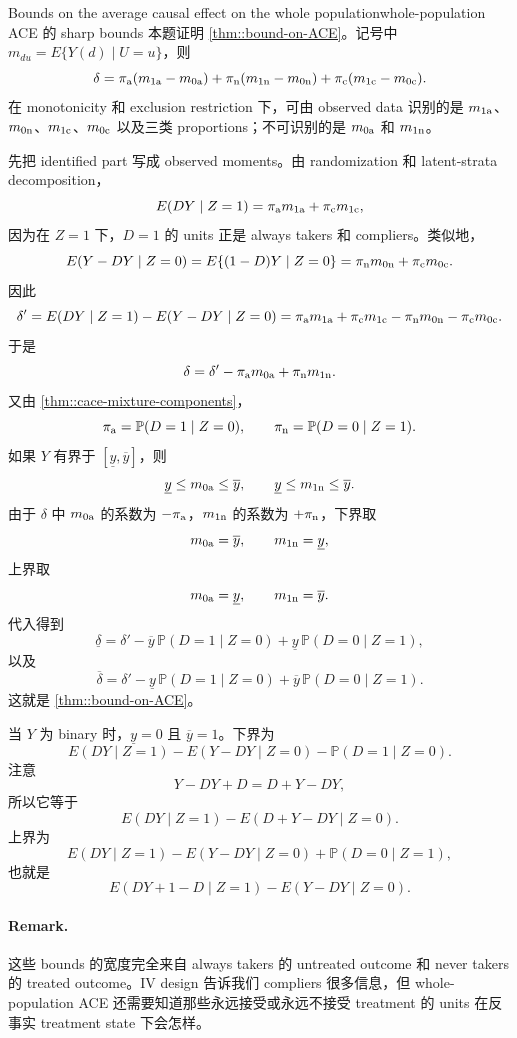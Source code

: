 \begin{exercisesolution}{Bounds on the average causal effect on the whole population}{whole-population ACE 的 sharp bounds}
本题证明 \cref{thm::bound-on-ACE}。记号中 $m_{du}=E\{Y(d)\mid U=u\}$，则
\[
\delta
=
\pi_{\textup{a}}(m_{1\textup{a}}-m_{0\textup{a}})
+\pi_{\textup{n}}(m_{1\textup{n}}-m_{0\textup{n}})
+\pi_{\textup{c}}(m_{1\textup{c}}-m_{0\textup{c}}).
\]
在 monotonicity 和 exclusion restriction 下，可由 observed data 识别的是 $m_{1\textup{a}}$、$m_{0\textup{n}}$、$m_{1\textup{c}}$、$m_{0\textup{c}}$ 以及三类 proportions；不可识别的是 $m_{0\textup{a}}$ 和 $m_{1\textup{n}}$。

先把 identified part 写成 observed moments。由 randomization 和 latent-strata decomposition，
\[
E(DY\mid Z=1)=\pi_{\textup{a}} m_{1\textup{a}}+\pi_{\textup{c}} m_{1\textup{c}},
\]
因为在 $Z=1$ 下，$D=1$ 的 units 正是 always takers 和 compliers。类似地，
\[
E(Y-DY\mid Z=0)
=E\{(1-D)Y\mid Z=0\}
=\pi_{\textup{n}} m_{0\textup{n}}+\pi_{\textup{c}} m_{0\textup{c}}.
\]
因此
\[
\delta'
=
E(DY\mid Z=1)-E(Y-DY\mid Z=0)
=
\pi_{\textup{a}} m_{1\textup{a}}+\pi_{\textup{c}} m_{1\textup{c}}
-\pi_{\textup{n}} m_{0\textup{n}}-\pi_{\textup{c}} m_{0\textup{c}}.
\]
于是
\[
\delta
=
\delta' - \pi_{\textup{a}} m_{0\textup{a}}+\pi_{\textup{n}} m_{1\textup{n}}.
\]
又由 \cref{thm::cace-mixture-components}，
\[
\pi_{\textup{a}}=\mathbb{P}(D=1\mid Z=0),
\qquad
\pi_{\textup{n}}=\mathbb{P}(D=0\mid Z=1).
\]
如果 $Y$ 有界于 $[\underline y,\overline y]$，则
\[
\underline y\leq m_{0\textup{a}}\leq \overline y,
\qquad
\underline y\leq m_{1\textup{n}}\leq \overline y.
\]
由于 $\delta$ 中 $m_{0\textup{a}}$ 的系数为 $-\pi_{\textup{a}}$，$m_{1\textup{n}}$ 的系数为 $+\pi_{\textup{n}}$，下界取
\[
m_{0\textup{a}}=\overline y,
\qquad
m_{1\textup{n}}=\underline y,
\]
上界取
\[
m_{0\textup{a}}=\underline y,
\qquad
m_{1\textup{n}}=\overline y.
\]
代入得到
\[
\underline{\delta}
=
\delta' - \overline y\,\mathbb{P}(D=1\mid Z=0)
+\underline y\,\mathbb{P}(D=0\mid Z=1),
\]
以及
\[
\overline{\delta}
=
\delta' - \underline y\,\mathbb{P}(D=1\mid Z=0)
+\overline y\,\mathbb{P}(D=0\mid Z=1).
\]
这就是 \cref{thm::bound-on-ACE}。

当 $Y$ 为 binary 时，$\underline y=0$ 且 $\overline y=1$。下界为
\[
E(DY\mid Z=1)-E(Y-DY\mid Z=0)-\mathbb{P}(D=1\mid Z=0).
\]
注意
\[
Y-DY+D=D+Y-DY,
\]
所以它等于
\[
E(DY\mid Z=1)-E(D+Y-DY\mid Z=0).
\]
上界为
\[
E(DY\mid Z=1)-E(Y-DY\mid Z=0)+\mathbb{P}(D=0\mid Z=1),
\]
也就是
\[
E(DY+1-D\mid Z=1)-E(Y-DY\mid Z=0).
\]

\paragraph{Remark.}
这些 bounds 的宽度完全来自 always takers 的 untreated outcome 和 never takers 的 treated outcome。IV design 告诉我们 compliers 很多信息，但 whole-population ACE 还需要知道那些永远接受或永远不接受 treatment 的 units 在反事实 treatment state 下会怎样。
\end{exercisesolution}

